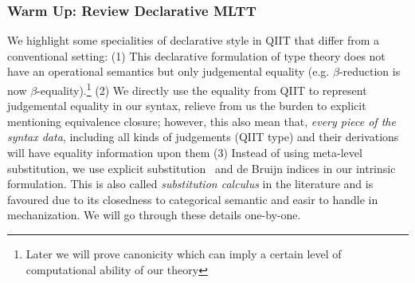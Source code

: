 
\subsubsection{\textbf{Warm Up: Review Declarative MLTT}}

We highlight some specialities of declarative style in QIIT that differ from a
conventional setting: 
(1) This declarative formulation of type theory does not
have an operational semantics but only judgemental equality (e.g. $\beta$-reduction is now $\beta$-equality).\footnote{Later we will prove
canonicity which can imply a certain level of computational ability of
our theory} 
(2) We directly use the equality from QIIT to represent judgemental equality in our syntax, relieve from us the burden to explicit mentioning equivalence closure; however, this also mean that, \textit{every piece of the syntax data}, including all kinds of judgements (QIIT type) and their derivations will have equality information upon them  
(3) Instead of using meta-level substitution, we use explicit
substitution~\cite{abadi1989subst} and de Bruijn indices in our intrinsic formulation. This is
also called \textit{substitution calculus} in the literature and is favoured due
to its closedness to categorical semantic and easir to handle in mechanization. We will go through these details one-by-one.




\newcommand\mathboxtext[1]{
  \fcolorbox{black}{faint-gray}{\ensuremath{#1}}
}


